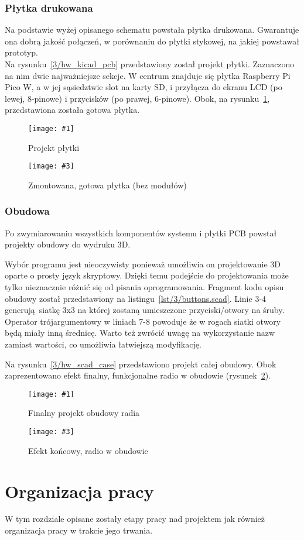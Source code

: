 \documentclass[polish]{aghengthesis}
\newcommand{\imgintss}[5]{
	\begin{figure}[{#5}]
		\centering
		\begin{minipage}{.45\textwidth}
			\centering
			\texttt{[image: \#1]}
			\caption{#2}
			\label{#1}
		\end{minipage}%
		\hfill
		\begin{minipage}{.45\textwidth}
			\centering
			\texttt{[image: \#3]}
			\caption{#4}
			\label{#3}
		\end{minipage}
	\end{figure}
}
\newcommand{\imghss}[4]{\imgintss{#1}{#2}{#3}{#4}{H}}
\newcommand{\lstfile}[3]{
	\noindent
	\hspace{0.1\linewidth}
	\begin{minipage}{0.8\linewidth}
		
	\end{minipage}
	\vspace{0.3cm}
}
\begin{document}
		\subsection{Płytka drukowana}
			Na podstawie wyżej opisanego schematu powstała płytka drukowana. Gwarantuje ona dobrą jakość połączeń, w porównaniu do płytki stykowej, na jakiej powstawał prototyp.
			$ $\\
			
			Na rysunku~\ref{3/hw_kicad_pcb} przedstawiony został projekt płytki. Zaznaczono na nim dwie najważniejsze sekcje. W centrum znajduje się płytka Raspberry Pi Pico W, a w jej sąsiedztwie slot na karty SD, i przyłącza do ekranu LCD (po lewej, 8-pinowe) i przycisków (po prawej, 6-pinowe). Obok, na rysunku~\ref{3/hw_pcb}, przedstawiona została gotowa płytka.
			
			\imghss{3/hw_kicad_pcb}{Projekt płytki}{3/hw_pcb}{Zmontowana, gotowa płytka (bez modułów)}
			
		\subsection{Obudowa}
			Po zwymiarowaniu wszystkich komponentów systemu i płytki PCB powstał projekty obudowy do wydruku 3D.
			
			Wybór programu jest nieoczywisty ponieważ umożliwia on projektowanie 3D oparte o prosty język skryptowy. Dzięki temu podejście do projektowania może tylko nieznacznie różnić się od pisania oprogramowania. Fragment kodu opisu obudowy został przedstawiony na listingu~\ref{lst/3/buttons.scad}. Linie 3-4 generują siatkę 3x3 na której zostaną umieszczone przyciski/otwory na śruby. Operator trójargumentowy w liniach 7-8 powoduje że w rogach siatki otwory będą miały inną średnicę. Warto też zwrócić uwagę na wykorzystanie nazw zamiast wartości, co umożliwia łatwiejszą modyfikację.
			
			\lstfile{scad}{Kod generujący otwory na przyciski i śruby montażowe}{lst/3/buttons.scad}
			
			Na rysunku~\ref{3/hw_scad_case} przedstawiono projekt całej obudowy. Obok zaprezentowano efekt finalny, funkcjonalne radio w obudowie (rysunek~\ref{3/hw_case}).
			
			\imghss{3/hw_scad_case}{Finalny projekt obudowy radia}{3/hw_case}{Efekt końcowy, radio w obudowie}
			
\chapter{Organizacja pracy}
	W tym rozdziale opisane zostały etapy pracy nad projektem jak również organizacja pracy w trakcie jego trwania.
	
\end{document}
